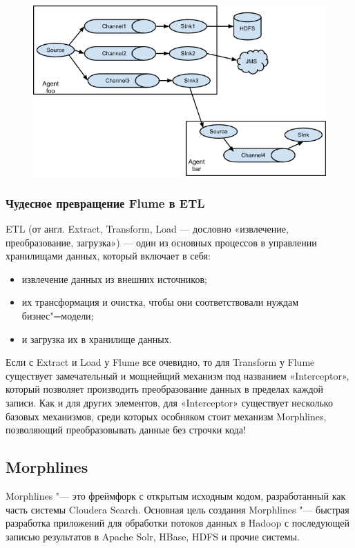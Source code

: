 \documentclass[10pt, a5paper]{article}
\begin{document}
\begin{figure}[h!]
  \centering
  \includegraphics[scale=0.5]{21_2014_UserGuide_image01.png}
\end{figure}

\subsubsection*{Чудесное превращение Flume в ETL}

ETL \cite{Pynkin2} (от англ. Extract, Transform, Load — дословно «извлечение, преобразование, загрузка») — один из основных процессов в управлении хранилищами данных, который включает в себя:

\begin{itemize}
  \item извлечение данных из внешних источников;
  \item их трансформация и очистка, чтобы они соответствовали нуждам бизнес"=модели;
  \item и загрузка их в хранилище данных.
\end{itemize}

Если с Extract и Load у Flume все очевидно, то для Transform у Flume существует замечательный и мощнейщий механизм под названием «Interceptor», который позволяет производить преобразование данных в пределах каждой записи.
Как и для других элементов, для «Interceptor» существует несколько базовых механизмов, среди которых особняком стоит механизм Morphlines, позволяющий преобразовывать данные без строчки кода!

\subsection*{Morphlines}

Morphlines  \cite{Pynkin3} "--- это фреймфорк с открытым исходным кодом, разработанный как часть системы Cloudera Search. Основная цель создания Morphlines "--- быстрая разработка приложений для обработки потоков данных в Hadoop с последующей записью результатов в  Apache Solr, HBase, HDFS и прочие системы.
\end{document}
